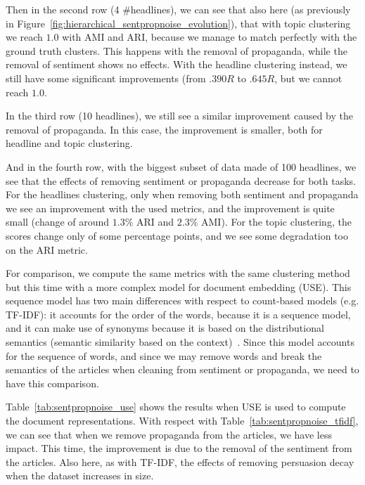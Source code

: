 Then in the second row (4 \#headlines), we can see that also here (as previously in Figure~\ref{fig:hierarchical_sentpropnoise_evolution}), that with topic clustering we reach $1.0$ with AMI and ARI, because we manage to match perfectly with the ground truth clusters.
This happens with the removal of propaganda, while the removal of sentiment shows no effects.
With the headline clustering instead, we still have some significant improvements (from $.390R$ to $.645R$, but we cannot reach $1.0$.

In the third row (10 headlines), we still see a similar improvement caused by the removal of propaganda. In this case, the improvement is smaller, both for headline and topic clustering.

And in the fourth row, with the biggest subset of data made of 100 headlines, we see that the effects of removing sentiment or propaganda decrease for both tasks. For the headlines clustering, only when removing both sentiment and propaganda we see an improvement with the used metrics, and the improvement is quite small (change of around $1.3\%$ ARI and $2.3\%$ AMI). For the topic clustering, the scores change only of some percentage points, and we see some degradation too on the ARI metric.

For comparison, we compute the same metrics with the same clustering method but this time with a more complex model for document embedding (USE). This sequence model has two main differences with respect to count-based models (e.g. TF-IDF): it accounts for the order of the words, because it is a sequence model, and it can make use of synonyms because it is based on the distributional semantics (semantic similarity based on the context)~\citep{firth1957synopsis}. Since this model accounts for the sequence of words, and since we may remove words and break the semantics of the articles when cleaning from sentiment or propaganda, we need to have this comparison.

Table~\ref{tab:sentpropnoise_use} shows the results when USE is used to compute the document representations.
With respect with Table~\ref{tab:sentpropnoise_tfidf}, we can see that when we remove propaganda from the articles, we have less impact. This time, the improvement is due to the removal of the sentiment from the articles.
Also here, as with TF-IDF, the effects of removing persuasion decay when the dataset increases in size.

